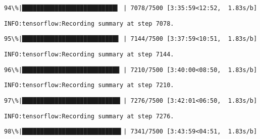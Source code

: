 \documentclass[11pt]{article}
\begin{document}
    \begin{Verbatim}[commandchars=\\\{\}]
 94\%|██████████████████████████▍ | 7078/7500 [3:35:59<12:52,  1.83s/b]
    \end{Verbatim}

    \begin{Verbatim}[commandchars=\\\{\}]
INFO:tensorflow:Recording summary at step 7078.

    \end{Verbatim}

    \begin{Verbatim}[commandchars=\\\{\}]
 95\%|██████████████████████████▋ | 7144/7500 [3:37:59<10:51,  1.83s/b]
    \end{Verbatim}

    \begin{Verbatim}[commandchars=\\\{\}]
INFO:tensorflow:Recording summary at step 7144.

    \end{Verbatim}

    \begin{Verbatim}[commandchars=\\\{\}]
 96\%|██████████████████████████▉ | 7210/7500 [3:40:00<08:50,  1.83s/b]
    \end{Verbatim}

    \begin{Verbatim}[commandchars=\\\{\}]
INFO:tensorflow:Recording summary at step 7210.

    \end{Verbatim}

    \begin{Verbatim}[commandchars=\\\{\}]
 97\%|███████████████████████████▏| 7276/7500 [3:42:01<06:50,  1.83s/b]
    \end{Verbatim}

    \begin{Verbatim}[commandchars=\\\{\}]
INFO:tensorflow:Recording summary at step 7276.

    \end{Verbatim}

    \begin{Verbatim}[commandchars=\\\{\}]
 98\%|███████████████████████████▍| 7341/7500 [3:43:59<04:51,  1.83s/b]
    \end{Verbatim}
\end{document}
